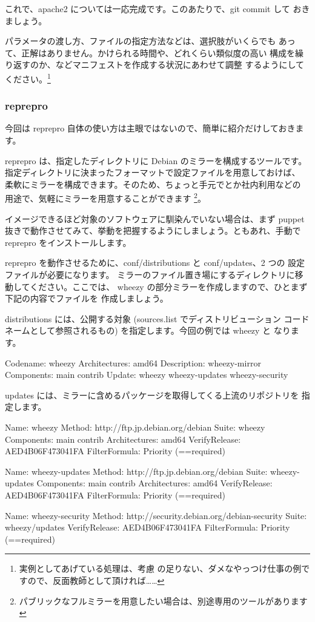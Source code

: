 \documentclass[mingoth,a4paper]{jsarticle}
\begin{document}
これで、apache2 については一応完成です。このあたりで、git commit して
おきましょう。

パラメータの渡し方、ファイルの指定方法などは、選択肢がいくらでも
あって、正解はありません。かけられる時間や、どれくらい類似度の高い
構成を繰り返すのか、などマニフェストを作成する状況にあわせて調整
するようにしてください。\footnote{実例としてあげている処理は、考慮
の足りない、ダメなやっつけ仕事の例ですので、反面教師として頂ければ……}

\subsubsection{reprepro}

今回は reprepro 自体の使い方は主眼ではないので、簡単に紹介だけしておきます。

reprepro は、指定したディレクトリに Debian のミラーを構成するツールです。
指定ディレクトリに決まったフォーマットで設定ファイルを用意しておけば、
柔軟にミラーを構成できます。そのため、ちょっと手元でとか社内利用などの
用途で、気軽にミラーを用意することができます
\footnote{パブリックなフルミラーを用意したい場合は、別途専用のツールがあります}。

イメージできるほど対象のソフトウェアに馴染んでいない場合は、まず puppet
抜きで動作させてみて、挙動を把握するようにしましょう。ともあれ、手動で
reprepro をインストールします。


reprepro を動作させるために、conf/distributions と conf/updates、2 つの
設定ファイルが必要になります。
ミラーのファイル置き場にするディレクトリに移動してください。ここでは、
wheezy の部分ミラーを作成しますので、ひとまず下記の内容でファイルを
作成しましょう。

distributions には、公開する対象 (sources.list でディストリビューション
コードネームとして参照されるもの) を指定します。今回の例では wheezy と
なります。

\begin{commandline}
Codename: wheezy
Architectures: amd64
Description: wheezy-mirror
Components: main contrib
Update: wheezy wheezy-updates wheezy-security
\end{commandline}

updates には、ミラーに含めるパッケージを取得してくる上流のリポジトリを
指定します。

\begin{commandline}
Name: wheezy
Method: http://ftp.jp.debian.org/debian
Suite: wheezy
Components: main contrib
Architectures: amd64
VerifyRelease: AED4B06F473041FA
FilterFormula: Priority (==required)

Name: wheezy-updates
Method: http://ftp.jp.debian.org/debian
Suite: wheezy-updates
Components: main contrib
Architectures: amd64
VerifyRelease: AED4B06F473041FA
FilterFormula: Priority (==required)

Name: wheezy-security
Method: http://security.debian.org/debian-security
Suite: wheezy/updates
VerifyRelease: AED4B06F473041FA
FilterFormula: Priority (==required)
\end{commandline}
\end{document}
